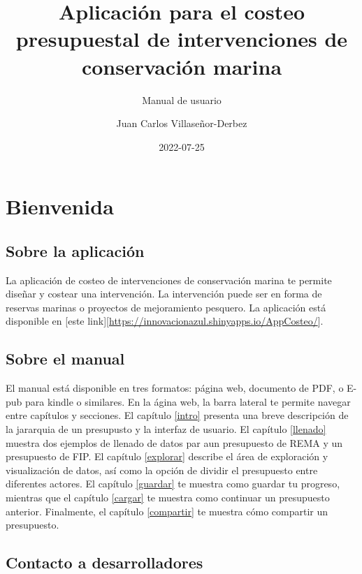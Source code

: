 \documentclass[
]{book}
\title{Aplicación para el costeo presupuestal de intervenciones de conservación marina}
\subtitle{Manual de usuario}
\author{Juan Carlos Villaseñor-Derbez}
\date{2022-07-25}
\begin{document}
\maketitle

{
\setcounter{tocdepth}{1}
\tableofcontents
}
\hypertarget{bienvenida}{%
\chapter{Bienvenida}\label{bienvenida}}

\hypertarget{sobre-la-aplicaciuxf3n}{%
\section{Sobre la aplicación}\label{sobre-la-aplicaciuxf3n}}

La aplicación de costeo de intervenciones de conservación marina te permite diseñar y costear una intervención. La intervención puede ser en forma de reservas marinas o proyectos de mejoramiento pesquero. La aplicación está disponible en {[}este link{]}{[}\url{https://innovacionazul.shinyapps.io/AppCosteo/}{]}.

\hypertarget{sobre-el-manual}{%
\section{Sobre el manual}\label{sobre-el-manual}}

El manual está disponible en tres formatos: página web, documento de PDF, o E-pub para kindle o similares. En la ágina web, la barra lateral te permite navegar entre capítulos y secciones. El capítulo \ref{intro} presenta una breve descripción de la jararquia de un presupusto y la interfaz de usuario. El capítulo \ref{llenado} muestra dos ejemplos de llenado de datos par aun presupuesto de REMA y un presupuesto de FIP. El capítulo \ref{explorar} describe el área de exploración y visualización de datos, así como la opción de dividir el presupuesto entre diferentes actores. El capítulo \ref{guardar} te muestra como guardar tu progreso, mientras que el capítulo \ref{cargar} te muestra como continuar un presupuesto anterior. Finalmente, el capítulo \ref{compartir} te muestra cómo compartir un presupuesto.

\hypertarget{contacto-a-desarrolladores}{%
\section{Contacto a desarrolladores}\label{contacto-a-desarrolladores}}
\end{document}
